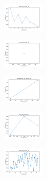 \begin{figure}[H]
    \begin{subfigure}
        \centering
        \includegraphics[width=0.234\textwidth]{img/copkm/ecoli_set_const_10_589741062_time.png}
    \end{subfigure}
    \hfill
    \begin{subfigure}
        \centering
        \includegraphics[width=0.234\textwidth]{img/copkm/rand_set_const_10_589741062_time.png}
    \end{subfigure}
    \hfill
    \begin{subfigure}
        \centering
        \includegraphics[width=0.234\textwidth]{img/copkm/newthyroid_set_const_10_589741062_time.png}
    \end{subfigure}
    \hfill
    \begin{subfigure}
        \centering
        \includegraphics[width=0.234\textwidth]{img/copkm/iris_set_const_10_277451237_time.png}
    \end{subfigure}
    \hfill
    \begin{subfigure}
        \centering
        \includegraphics[width=0.234\textwidth]{img/copkm/ecoli_set_const_10_277451237_time.png}
    \end{subfigure}
    \hfill
    \begin{subfigure}
        \centering

\end{subfigure}
\end{figure}
